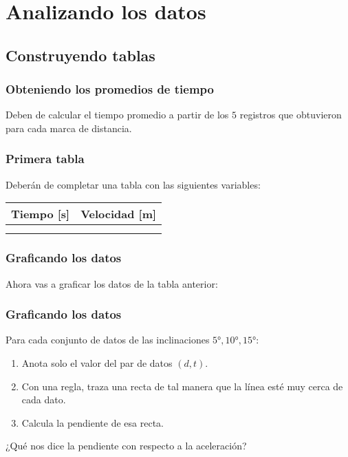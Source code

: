 \documentclass[14pt]{beamer}
\begin{document}
\section{Analizando los datos}
\subsection{Construyendo tablas}

\begin{frame}
\frametitle{Obteniendo los promedios de tiempo}
Deben de calcular el tiempo promedio a partir de los $5$ registros que obtuvieron para cada marca de distancia.
\end{frame}
\begin{frame}
\frametitle{Primera tabla}
Deberán de completar una tabla con las siguientes variables:
\begin{table}
    \centering
    \begin{tabular}{c | c}
        Tiempo [\unit{\second}] & Velocidad [\unit{\meter}] \\ \hline
         & \\ \hline       
         & \\ \hline       
    \end{tabular}
\end{table}
\end{frame}
\begin{frame}
\frametitle{Graficando los datos}
Ahora vas a graficar los datos de la tabla anterior:
\begin{figure}
    \centering
\end{figure}
\end{frame}
\begin{frame}
\frametitle{Graficando los datos}
Para cada conjunto de datos de las inclinaciones $\ang{5}, \ang{10}, \ang{15}$:
\begin{enumerate}[<+->]
\item Anota solo el valor del par de datos $(d, t)$.
\item Con una regla, traza una recta de tal manera que la línea esté muy cerca de cada dato.
\item Calcula la pendiente de esa recta.
\end{enumerate}
\pause
¿Qué nos dice la pendiente con respecto a la aceleración?
\end{frame}
\end{document}
